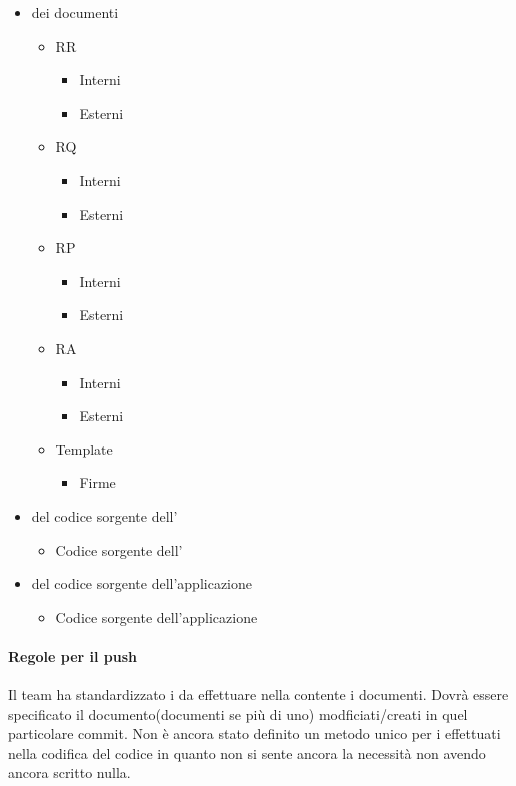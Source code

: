 \begin{itemize}
  \item {} dei documenti
  	\begin{itemize}
  		\item RR
			\begin{itemize}
				\item Interni
				\item Esterni
			\end{itemize}
  		\item RQ
  			\begin{itemize}
				\item Interni
				\item Esterni
			\end{itemize}
  		\item RP
  			\begin{itemize}
				\item Interni
				\item Esterni
			\end{itemize}
  		\item RA
  			\begin{itemize}
				\item Interni
				\item Esterni
			\end{itemize}
  		\item Template
  			\begin{itemize}
  				\item Firme
  			\end{itemize}
  	\end{itemize}
  	\item {} del codice sorgente dell'
  		\begin{itemize}
  			\item Codice sorgente dell'
  		\end{itemize}
  	\item {} del codice sorgente dell'applicazione 
  		\begin{itemize}
  			\item Codice sorgente dell'applicazione 
  		\end{itemize}
  	
\end{itemize}

\paragraph{Regole per il push}
Il team ha standardizzato i  da effettuare nella  contente i documenti. Dovrà essere specificato il documento(documenti se più di uno) modficiati/creati in quel particolare commit. Non è ancora stato definito un metodo unico per i  effettuati nella codifica del codice in quanto non si sente ancora la necessità non avendo ancora scritto nulla.

